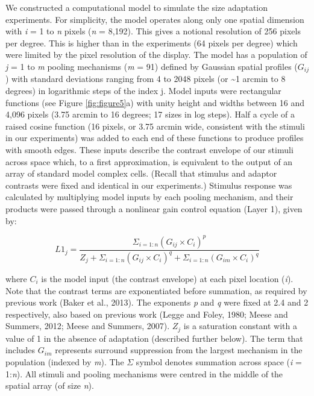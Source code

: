 \documentclass[
]{article}
\begin{document}
We constructed a computational model to simulate the size adaptation experiments. For simplicity, the model operates along only one spatial dimension with \emph{i} = 1 to \emph{n} pixels (\emph{n} = 8,192). This gives a notional resolution of 256 pixels per degree. This is higher than in the experiments (64 pixels per degree) which were limited by the pixel resolution of the display. The model has a population of \emph{j} = 1 to \emph{m} pooling mechanisms (\emph{m} = 91) defined by Gaussian spatial profiles (\(G_{ij}\)) with standard deviations ranging from 4 to 2048 pixels (or \textasciitilde1 arcmin to 8 degrees) in logarithmic steps of the index j. Model inputs were rectangular functions (see Figure \ref{fig:figure5}a) with unity height and widths between 16 and 4,096 pixels (3.75 arcmin to 16 degrees; 17 sizes in log steps). Half a cycle of a raised cosine function (16 pixels, or 3.75 arcmin wide, consistent with the stimuli in our experiments) was added to each end of these functions to produce profiles with smooth edges. These inputs describe the contrast envelope of our stimuli across space which, to a first approximation, is equivalent to the output of an array of standard model complex cells. (Recall that stimulus and adaptor contrasts were fixed and identical in our experiments.) Stimulus response was calculated by multiplying model inputs by each pooling mechanism, and their products were passed through a nonlinear gain control equation (Layer 1), given by:

\begin{equation}
  L1_j = \frac{\Sigma_{i=1:n}(G_{ij} \times C_i)^p}{Z_j + \Sigma_{i=1:n}(G_{ij} \times C_i)^q + \Sigma_{i=1:n}(G_{im} \times C_i)^q}
\end{equation}

where \(C_i\) is the model input (the contrast envelope) at each pixel location (\emph{i}). Note that the contrast terms are exponentiated before summation, as required by previous work (Baker et al., 2013). The exponents \emph{p} and \emph{q} were fixed at 2.4 and 2 respectively, also based on previous work (Legge and Foley, 1980; Meese and Summers, 2012; Meese and Summers, 2007). \(Z_j\) is a saturation constant with a value of 1 in the absence of adaptation (described further below). The term that includes \(G_{im}\) represents surround suppression from the largest mechanism in the population (indexed by \emph{m}). The \(\Sigma\) symbol denotes summation across space (\emph{i} = 1:\emph{n}). All stimuli and pooling mechanisms were centred in the middle of the spatial array (of size \emph{n}).
\end{document}

